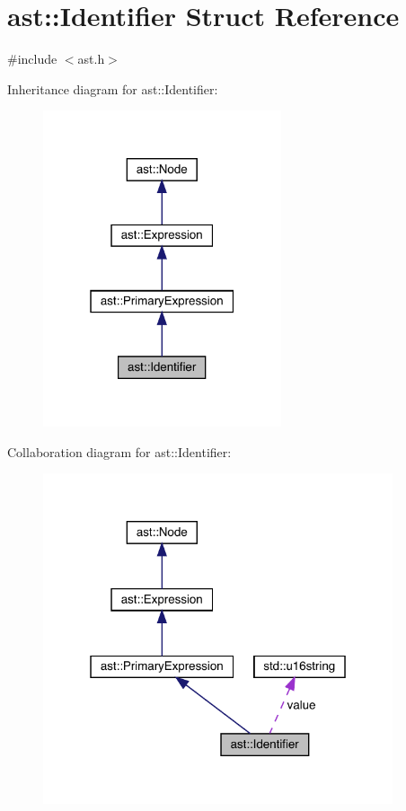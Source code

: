 \hypertarget{structast_1_1_identifier}{}\section{ast\+:\+:Identifier Struct Reference}
\label{structast_1_1_identifier}


{\ttfamily \#include $<$ast.\+h$>$}



Inheritance diagram for ast\+:\+:Identifier\+:\nopagebreak
\begin{figure}[H]
\begin{center}
\leavevmode
\includegraphics[width=199pt]{structast_1_1_identifier__inherit__graph}
\end{center}
\end{figure}


Collaboration diagram for ast\+:\+:Identifier\+:\nopagebreak
\begin{figure}[H]
\begin{center}
\leavevmode
\includegraphics[width=292pt]{structast_1_1_identifier__coll__graph}
\end{center}
\end{figure}
